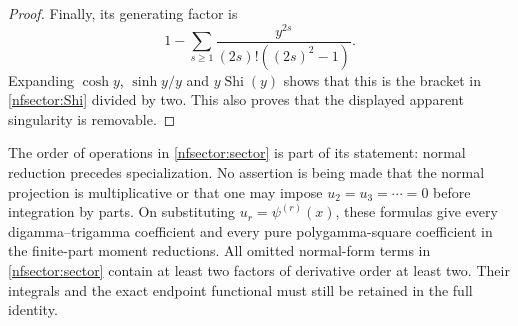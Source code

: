 \begin{proof}
Finally, its generating factor is
\[
 1-\sum_{s\ge1}\frac{y^{2s}}{(2s)!((2s)^2-1)}.
\]
Expanding $\cosh y$, $\sinh y/y$ and $y\operatorname{Shi}(y)$
shows that this is the bracket in \eqref{nfsector:Shi} divided by two.
This also proves that the displayed apparent singularity is removable.
\end{proof}

The order of operations in \eqref{nfsector:sector} is part of its
statement: normal reduction precedes specialization.  No assertion is
being made that the normal projection is multiplicative or that one
may impose $u_2=u_3=\cdots=0$ before integration by parts.
On substituting $u_r=\psi^{(r)}(x)$, these formulas give every
digamma--trigamma coefficient and every pure polygamma-square coefficient
in the finite-part moment reductions.  All omitted normal-form terms
in \eqref{nfsector:sector} contain at least two factors of derivative
order at least two.  Their integrals and the exact endpoint functional
must still be retained in the full identity.
